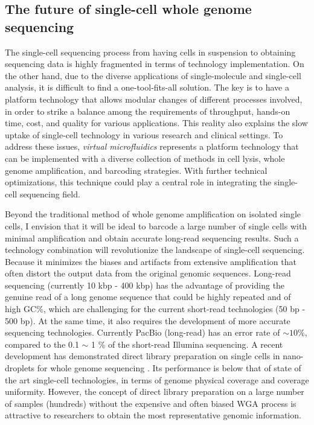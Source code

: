 \subsection{The future of single-cell whole genome sequencing}
The single-cell sequencing process from having cells in suspension to obtaining sequencing data is highly fragmented in terms of technology implementation. On the other hand, due to the diverse applications of single-molecule and single-cell analysis, it is difficult to find a one-tool-fits-all solution. The key is to have a platform technology that allows modular changes of different processes involved, in order to strike a balance among the requirements of throughput, hands-on time, cost, and quality for various applications. This reality also explains the slow uptake of single-cell technology in various research and clinical settings. To address these issues, \textit{virtual microfluidics} represents a platform technology that can be implemented with a diverse collection of methods in cell lysis, whole genome amplification, and barcoding strategies. With further technical optimizations, this technique could play a central role in integrating the single-cell sequencing field.

Beyond the traditional method of whole genome amplification on isolated single cells, I envision that it will be ideal to barcode a large number of single cells with minimal amplification and obtain accurate long-read sequencing results. Such a technology combination will revolutionize the landscape of single-cell sequencing. Because it minimizes the biases and artifacts from extensive amplification that often distort the output data from the original genomic sequences. Long-read sequencing (currently 10 kbp - 400 kbp) has the advantage of providing the genuine read of a long genome sequence that could be highly repeated and of high GC\%, which are challenging for the current short-read technologies (50 bp - 500 bp). At the same time, it also requires the development of more accurate sequencing technologies. Currently PacBio (long-read) has an error rate of $\sim 10\%$, compared to the 0.1 $\sim$ 1 \% of the short-read Illumina sequencing. A recent development has demonstrated direct library preparation on single cells in nano-droplets for whole genome sequencing \cite{Zahn:2017fb}. Its performance is below that of state of the art single-cell technologies, in terms of genome physical coverage and coverage uniformity. However, the concept of direct library preparation on a large number of samples (hundreds) without the expensive and often biased WGA process is attractive to researchers to obtain the most representative genomic information. 

